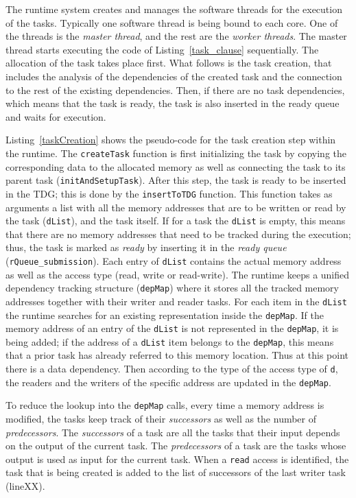 The runtime system creates and manages the software threads for the execution of the tasks. 
Typically one software thread is being bound to each core. 
One of the threads is the \textit{master thread}, and the rest are the \textit{worker threads}. 
The master thread starts executing the code of Listing~\ref{task_clause} sequentially. 
The allocation of the task takes place first.
What follows is the task creation, that includes the analysis of the dependencies of the created task and the connection to the rest of the existing dependencies.
Then, if there are no task dependencies, which means that the task is ready, the task is also inserted in the ready queue and waits for execution.

Listing~\ref{taskCreation} shows the pseudo-code for the task creation step within the runtime.
The \texttt{createTask} function is first initializing the task by copying the corresponding data to the allocated memory as well as connecting the task to its parent task (\texttt{initAndSetupTask}).
After this step, the task is ready to be inserted in the TDG; this is done by the \texttt{insertToTDG} function.
This function takes as arguments a list with all the memory addresses that are to be written or read by the task (\texttt{dList}), and the task itself.
If for a task the \texttt{dList} is empty, this means that there are no memory addresses that need to be tracked during the execution; thus, the task is marked as \textit{ready} by inserting it in the \textit{ready queue} (\texttt{rQueue\_submission}).
Each entry of \texttt{dList} contains the actual memory address as well as the access type (read, write or read-write).
The runtime keeps a unified dependency tracking structure (\texttt{depMap}) where it stores all the tracked memory addresses together with their writer and reader tasks.
For each item in the \texttt{dList} the runtime searches for an existing representation inside the \texttt{depMap}.
If the memory address of an entry of the \texttt{dList} is not represented in the \texttt{depMap}, it is being added;
if the address of a \texttt{dList} item belongs to the \texttt{depMap}, this means that a prior task has already referred to this memory location. 
Thus at this point there is a data dependency.
Then according to the type of the access type of \texttt{d}, the readers and the writers of the specific address are updated in the \texttt{depMap}.

To reduce the lookup into the \texttt{depMap} calls, every time a memory address is modified, the tasks keep track of their \textit{successors} as well as the number of \textit{predecessors}.
The \textit{successors} of a task are all the tasks that their input depends on the output of the current task.
The \textit{predecessors} of a task are the tasks whose output is used as input for the current task.
When a \texttt{read} access is identified, the task that is being created is added to the list of successors of the last writer task (lineXX).

